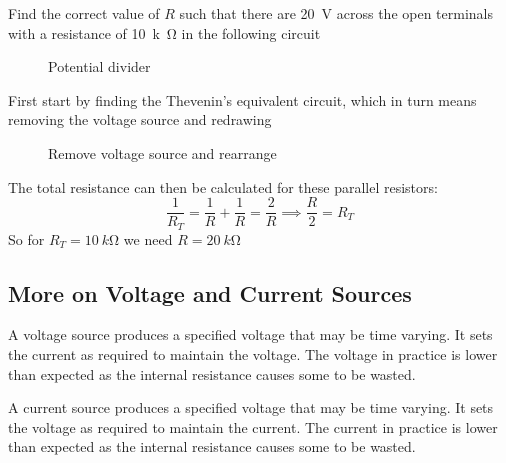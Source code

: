 \documentclass{article}
\begin{document}
    \example
    Find the correct value of \(R\) such that there are \SI{20}{V} across the open terminals with a resistance of \SI{10}{k\ohm} in the following circuit
    \begin{figure}[ht]
        \centering
        \caption{Potential divider}
        \label{fig:potential divider}
    \end{figure}
    First start by finding the Thevenin's equivalent circuit, which in turn means removing the voltage source and redrawing
    \begin{figure}[ht]
        \centering
        \caption{Remove voltage source and rearrange}
    \end{figure}
    The total resistance can then be calculated for these parallel resistors:
    \[\frac{1}{R_T} = \frac{1}{R}+\frac{1}{R} = \frac{2}{R}\implies \frac{R}{2}=R_T\]
    So for \(R_T=\SI{10}{k\ohm}\) we need \(R=\SI{20}{k\ohm}\)

    \subsection{More on Voltage and Current Sources}
    A voltage source produces a specified voltage that may be time varying. It sets the current as required to maintain the voltage. The voltage in practice is lower than expected as the internal resistance causes some to be wasted.
    
    A current source produces a specified voltage that may be time varying. It sets the voltage as required to maintain the current. The current in practice is lower than expected as the internal resistance causes some to be wasted.
    
\end{document}
